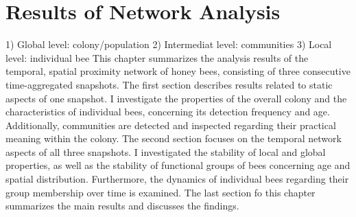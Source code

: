 \chapter{Results of Network Analysis}
\label{ch:results}
1) Global level: colony/population
2) Intermediat level: communities
3) Local level: individual bee
This chapter summarizes the analysis results of the temporal, spatial proximity network of honey bees, consisting of three consecutive time-aggregated snapshots.
The first section describes results related to static aspects of one snapshot.
I investigate the properties of the overall colony and the characteristics of individual bees, concerning its detection frequency and age.
Additionally, communities are detected and inspected regarding their practical meaning within the colony.
The second section focuses on the temporal network aspects of all three snapshots.
I investigated the stability of local and global properties, as well as the stability of functional groups of bees concerning age and spatial distribution. Furthermore, the dynamics of individual bees regarding their group membership over time is examined.
The last section fo this chapter summarizes the main results and discusses the findings.



